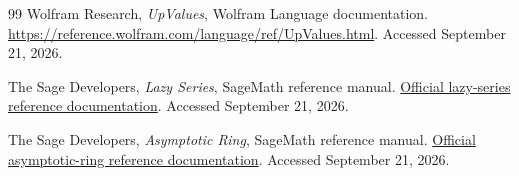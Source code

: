 \documentclass[11pt,letterpaper]{article}
\theoremstyle{definition}\newtheorem{definition}[theorem]{Definition}
\theoremstyle{remark}\newtheorem{remark}[theorem]{Remark}
\numberwithin{equation}{section}\setcounter{tocdepth}{2}
\begin{document}
\begin{thebibliography}{99}
Wolfram Research, \emph{UpValues}, Wolfram Language documentation.
\url{https://reference.wolfram.com/language/ref/UpValues.html}.
Accessed September 21, 2026.

The Sage Developers, \emph{Lazy Series}, SageMath reference manual.
\href{https://doc.sagemath.org/html/en/reference/power_series/sage/rings/lazy_series.html}{Official lazy-series reference documentation}.
Accessed September 21, 2026.

The Sage Developers, \emph{Asymptotic Ring}, SageMath reference manual.
\href{https://doc.sagemath.org/html/en/reference/asymptotic/sage/rings/asymptotic/asymptotic_ring.html}{Official asymptotic-ring reference documentation}.
Accessed September 21, 2026.
\end{thebibliography}
\end{document}
